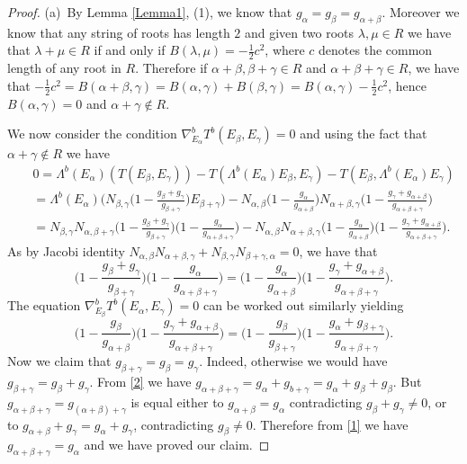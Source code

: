 \documentclass{amsart}
\numberwithin{equation}{section}
\theoremstyle{definition}
\renewcommand{\1}{\mathds{1}}
\renewcommand{\a}{\alpha}
\renewcommand{\b}{\beta}
\newcommand{\g}{\gamma}
\renewcommand{\>}{\rightarrow}
\newcommand{\Lb}{\Lambda^b}
\begin{document}
\begin{proof}
(a)\ By Lemma \ref{Lemma1}, (1), we know that $g_\a=g_\b=g_{\a+\b}$. Moreover we know that any string of roots has length $2$ and given two roots $\lambda,\mu\in R$ we have that $\lambda+\mu\in R$ if and only if $B(\lambda,\mu) = -\frac 12 c^2$, where $c$ denotes the common length of any root in $R$. Therefore if $\a+\b,\b+\g\in R$ and $\a+\b+\g\in R$, we have that $-\frac 12 c^2=B(\a+\b,\g)=B(\a,\g)+B(\b,\g)=B(\a,\g)-\frac 12 c^2$, hence $B(\a,\g)=0$ and $\a+\g\not\in R$.\par We now consider the condition $\nabla^b_{E_\a}T^b(E_\b,E_\g)=0$ and using the fact that $\a+\g\not\in R$ we have
\begin{eqnarray*}
&&0=\Lambda^b(E_\a)(T(E_\b,E_\g))-T(\Lambda^b(E_\a)E_\b,E_\g) - T(E_\b,\Lambda^b(E_\a)E_\g) \\
&&=\Lb(E_\a)\big(N_{\b,\g}\big( 1-\frac{g_\b+g_\g}{g_{\b+\g}}\big)E_{\b+\g}\big) - N_{\a,\b}\big(1-\frac{g_\a}{g_{\a+\b}}\big)N_{\a+\b,\g}\big(1-\frac{g_\g+g_{\a+\b}}{g_{\a+\b+\g}}\big)\\
&&= N_{\b,\g}N_{\a,\b+\g}\big( 1-\frac{g_\b+g_\g}{g_{\b+\g}}\big)\big(1-\frac{g_\a}{g_{\a+\b+\g}}\big) - N_{\a,\b}N_{\a+\b,\g}\big(1-\frac{g_\a}{g_{\a+\b}}\big)\big(1-\frac{g_\g+g_{\a+\b}}{g_{\a+\b+\g}}\big).
\end{eqnarray*}
As by Jacobi identity $N_{\a,\b}N_{\a+\b,\g}+N_{\b,\g}N_{\b+\g,\a} =0$, we have that
\begin{equation}\label{1} \big( 1-\frac{g_\b+g_\g}{g_{\b+\g}}\big)\big(1-\frac{g_\a}{g_{\a+\b+\g}}\big) = \big(1-\frac{g_\a}{g_{\a+\b}}\big)\big(1-\frac{g_\g+g_{\a+\b}}{g_{\a+\b+\g}}\big).
\end{equation}
The equation $\nabla^b_{E_\b}T^b(E_\a,E_\g)=0$ can be worked out similarly yielding
\begin{equation}\label{2} \big(1-\frac{g_\b}{g_{\a+\b}}\big)\big( 1-\frac{g_\g+g_{\a+\b}}{g_{\a+\b+\g}}\big) = \big(1-\frac{g_\b}{g_{\b+\g}}\big)\big(1-\frac{g_\a+g_{\b+\g}}{g_{\a+\b+\g}}\big).
\end{equation}
Now we claim that $g_{\b+\g}= g_\b = g_\g$. Indeed, otherwise we would have $g_{\b+\g}=g_\b+g_\g$. From \eqref{2} we have $g_{\a+\b+\g}=g_\a+g_{b+\g}=g_\a+g_\b+g_\b$. But
$g_{\a+\b+\g}= g_{(\a+\b)+\g}$ is equal either to $g_{\a+\b}=g_\a$ contradicting $g_\b+g_\g\neq 0$, or to $g_{\a+\b}+g_\g = g_\a+g_\g$, contradicting $g_\b\neq 0$. Therefore from \eqref{1} we have $g_{\a+\b+\g}= g_\a$ and we have proved our claim.

\end{proof}
\end{document}
